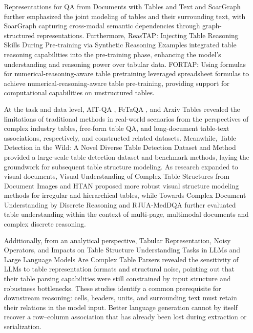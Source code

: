 Representations for QA from Documents with Tables and Text \cite{zayats2021representations} and SoarGraph \cite{zhu2023soargraph} further emphasized the joint modeling of tables and their surrounding text, with SoarGraph capturing cross-modal semantic dependencies through graph-structured representations. Furthermore, ReasTAP: Injecting Table Reasoning Skills During Pre-training via Synthetic Reasoning Examples \cite{liu2023reastap} integrated table reasoning capabilities into the pre-training phase, enhancing the model's understanding and reasoning power over tabular data. FORTAP: Using formulas for numerical-reasoning-aware table pretraining \cite{cheng2022fortap} leveraged spreadsheet formulas to achieve numerical-reasoning-aware table pre-training, providing support for computational capabilities on unstructured tables.

At the task and data level, AIT-QA \cite{katsis2022ait}, FeTaQA \cite{nan2022fetaqa}, and Arxiv Tables \cite{konopka2023arxiv} revealed the limitations of traditional methods in real-world scenarios from the perspectives of complex industry tables, free-form table QA, and long-document table-text associations, respectively, and constructed related datasets. Meanwhile, Table Detection in the Wild: A Novel Diverse Table Detection Dataset and Method \cite{li2021tablewild} provided a large-scale table detection dataset and benchmark methods, laying the groundwork for subsequent table structure modeling. As research expanded to visual documents, Visual Understanding of Complex Table Structures from Document Images \cite{raja2022visual} and HTAN \cite{wu2025htan} proposed more robust visual structure modeling methods for irregular and hierarchical tables, while Towards Complex Document Understanding by Discrete Reasoning \cite{zhu2022towards} and RJUA-MedDQA \cite{jin2024rjua} further evaluated table understanding within the context of multi-page, multimodal documents and complex discrete reasoning.

Additionally, from an analytical perspective, Tabular Representation, Noisy Operators, and Impacts on Table Structure Understanding Tasks in LLMs \cite{singha2023tabular} and Large Language Models Are Complex Table Parsers \cite{zhao2023large} revealed the sensitivity of LLMs to table representation formats and structural noise, pointing out that their table parsing capabilities were still constrained by input structure and robustness bottlenecks. These studies identify a common prerequisite for downstream reasoning: cells, headers, units, and surrounding text must retain their relations in the model input. Better language generation cannot by itself recover a row--column association that has already been lost during extraction or serialization.

